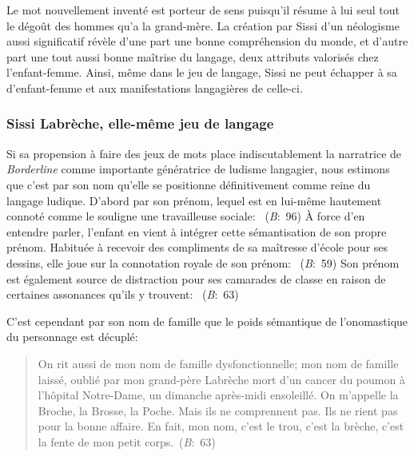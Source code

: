 Le mot  nouvellement inventé est porteur de sens puisqu'il résume à lui seul tout le dégoût des hommes qu'a la grand-mère.
La création par Sissi d'un néologisme aussi significatif révèle d'une part une bonne compréhension du monde, et d'autre part une tout aussi bonne maîtrise du langage, deux attributs valorisés chez l'enfant-femme.
Ainsi, même dans le jeu de langage, Sissi ne peut échapper à sa  d'enfant-femme et aux manifestations langagières de celle-ci.

\subsubsection{Sissi Labrèche, elle-même jeu de langage}
Si sa propension à faire des jeux de mots place indiscutablement la narratrice de \textit{Borderline} comme importante génératrice de ludisme langagier, nous estimons que c'est par son nom qu'elle se positionne définitivement comme reine du langage ludique.
D'abord par son prénom, lequel est en lui-même hautement connoté comme le souligne une travailleuse sociale: ~(\textit{B}:~96)
À force d'en entendre parler, l'enfant en vient à intégrer cette sémantisation de son propre prénom.
Habituée à recevoir des compliments de sa maîtresse d'école pour ses dessins, elle joue sur la connotation royale de son prénom: ~(\textit{B}:~59)
Son prénom est également source de distraction pour ses camarades de classe en raison de certaines assonances qu'ils y trouvent: ~(\textit{B}:~63)
\par
C'est cependant par son nom de famille que le poids sémantique de l'onomastique du personnage est décuplé:
\begin{quote}
  \begin{singlespace}
    \small
    On rit aussi de mon nom de famille dysfonctionnelle; mon nom de famille laissé, oublié par mon grand-père Labrèche mort d'un cancer du poumon à l'hôpital Notre-Dame, un dimanche après-midi ensoleillé. On m'appelle la Broche, la Brosse, la Poche. Mais ils ne comprennent pas. Ils ne rient pas pour la bonne affaire. En fait, mon nom, c'est le trou, c'est la brèche, c'est la fente de mon petit corps.~(\textit{B}:~63)
    \normalsize
  \end{singlespace}
\end{quote}
